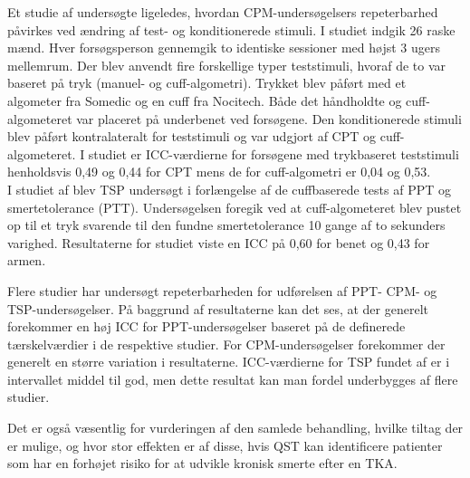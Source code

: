 Et studie af  undersøgte ligeledes, hvordan CPM-undersøgelsers repeterbarhed påvirkes ved ændring af test- og konditionerede stimuli. I studiet indgik 26 raske mænd. Hver forsøgsperson gennemgik to identiske sessioner med højst 3 ugers mellemrum. Der blev anvendt fire forskellige typer teststimuli, hvoraf de to var baseret på tryk (manuel- og cuff-algometri). Trykket blev påført med et algometer fra Somedic og en cuff fra Nocitech. Både det håndholdte og cuff-algometeret var placeret på underbenet ved forsøgene. Den konditionerede stimuli blev påført kontralateralt for teststimuli og var udgjort af CPT og cuff-algometeret. I studiet er ICC-værdierne for forsøgene med trykbaseret teststimuli henholdsvis 0,49 og 0,44 for CPT mens de for cuff-algometri er 0,04 og 0,53.\\ 
I studiet af  blev TSP undersøgt i forlængelse af de cuffbaserede tests af PPT og smertetolerance (PTT). Undersøgelsen foregik ved at cuff-algometeret blev pustet op til et tryk svarende til den fundne smertetolerance 10 gange af to sekunders varighed. Resultaterne for studiet viste en ICC på 0,60 for benet og 0,43 for armen.  


Flere studier har undersøgt repeterbarheden for udførelsen af PPT- CPM- og TSP-undersøgelser. På baggrund af resultaterne kan det ses, at der generelt forekommer en høj ICC for PPT-undersøgelser baseret på de definerede tærskelværdier i de respektive studier. For CPM-undersøgelser forekommer der generelt en større variation i resultaterne. ICC-værdierne for TSP fundet af  er i intervallet middel til god, men dette resultat kan man fordel underbygges af flere studier. 


Det er også væsentlig for vurderingen af den samlede behandling, hvilke tiltag der er mulige, og hvor stor effekten er af disse, hvis QST kan identificere patienter som har en forhøjet risiko for at udvikle kronisk smerte efter en TKA.

